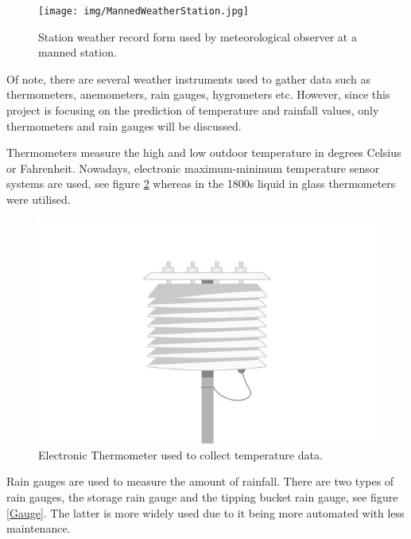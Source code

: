 \begin{figure}[h]
\centering
\texttt{[image: img/MannedWeatherStation.jpg]}
\caption{Station weather record form used by meteorological observer at a manned station. }
\label{MetForm}
\end{figure}
Of note, there are several weather instruments used to gather data such as thermometers, anemometers, rain gauges, hygrometers etc. However, since this project is focusing on the prediction of temperature and rainfall values, only thermometers and rain gauges will be discussed.

Thermometers measure the high and low outdoor temperature in degrees Celsius or Fahrenheit. Nowadays, electronic maximum-minimum temperature sensor systems are used, see figure \ref{Thermometer} whereas in the 1800s liquid in glass thermometers were utilised.\cite{WeatherInstruments}

\begin{figure}[h]
\centering
\includegraphics[scale=0.2]{img/MaxMinThermometer.jpg}
\caption{Electronic Thermometer used to collect temperature data.}
\label{Thermometer}
\end{figure}

Rain gauges are used to measure the amount of rainfall. There are two types of rain gauges, the storage rain gauge and the tipping bucket rain gauge, see figure \ref{Gauge}. The latter is more widely used due to it being more automated with less maintenance.\cite{RainGauge}

